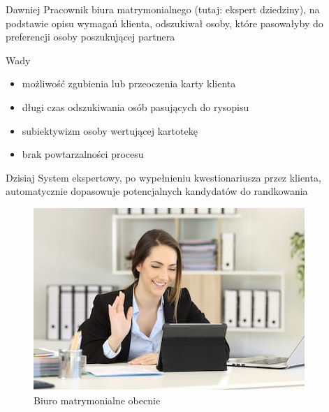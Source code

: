 \documentclass{beamer}
\begin{document}
\begin{frame}

	\begin{block}{Dawniej}
		Pracownik biura matrymonialnego (tutaj: ekspert dziedziny), na podstawie opisu wymagań klienta, odszukiwał osoby, które pasowałyby do preferencji osoby poszukującej partnera
	\end{block}
	
	\begin{block}{Wady}
		\begin{itemize}
			\item możliwość zgubienia lub przeoczenia karty klienta
			\item długi czas odszukiwania osób pasujących do rysopisu
			\item subiektywizm osoby wertującej kartotekę
			\item brak powtarzalności procesu
		\end{itemize}
	\end{block}

\end{frame}

\begin{frame}
	
	\begin{block}{Dzisiaj}
		System ekspertowy, po wypełnieniu kwestionariusza przez klienta, automatycznie dopasowuje potencjalnych kandydatów do randkowania
	\end{block}
	
	\begin{figure}
		\centering
		\includegraphics[height=0.5\textheight,keepaspectratio]{images/biuro-dzisiaj.jpg}
		\caption{Biuro matrymonialne obecnie}
	\end{figure}

\end{frame}
\end{document}
